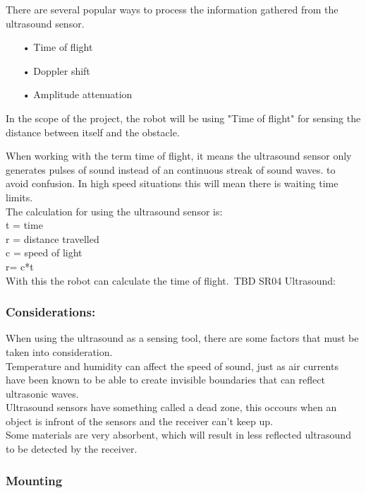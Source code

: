 There are several popular ways to process the information gathered from the ultrasound sensor. \\

\begin{enumerate}
	\item[•]Time of flight
	\item[•]Doppler shift
	\item[•]Amplitude attenuation
\end{enumerate}

In the scope of the project, the robot will be using "Time of flight" for sensing the distance between itself and the obstacle.\

When working with the term time of flight, it means the ultrasound sensor only generates pulses of sound instead of an continuous streak of sound waves. to avoid confusion. In high speed situations this will mean there is waiting time limits.\\ 

The calculation for using the ultrasound sensor is: \\

t = time\\
r = distance travelled\\
c = speed of light\\

r= c*t\\

With this the robot can calculate the time of flight.\
TBD SR04 Ultrasound:\
\subsubsection{Considerations:}
When using the ultrasound as a sensing tool, there are some factors that must be taken into consideration.\\ Temperature and humidity can affect the speed of sound, just as air currents have been known to be able to create invisible boundaries that can reflect ultrasonic waves.\\
Ultrasound sensors have something called a dead zone, this occours when an object is infront of the sensors and the receiver can't keep up.\\
Some materials are very absorbent, which will result in less reflected ultrasound to be detected by the receiver.

\subsubsection{Mounting}

